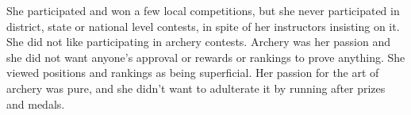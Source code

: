 She participated and won a few local competitions, but she never participated in
district, state or national level contests, in spite of her
instructors insisting on it. She did not like participating in archery contests.
Archery was her passion and she did not want anyone's approval or rewards or
rankings to prove anything. She viewed positions and rankings as being
superficial. Her passion for the art of archery was pure, and she didn't want to
adulterate it by running after prizes and medals.